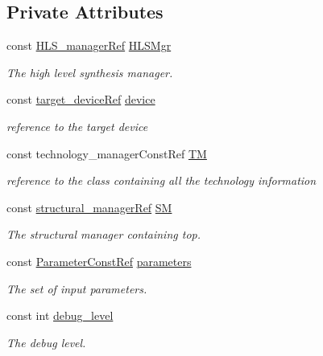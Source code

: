 \subsection*{Private Attributes}
\begin{DoxyCompactItemize}
\item 
const \hyperlink{hls__manager_8hpp_acd3842b8589fe52c08fc0b2fcc813bfe}{H\+L\+S\+\_\+manager\+Ref} \hyperlink{classHDL__manager_a97f281a1319403619497d1d3fec65787}{H\+L\+S\+Mgr}
\begin{DoxyCompactList}\small\item\em The high level synthesis manager. \end{DoxyCompactList}\item 
const \hyperlink{target__device_8hpp_acedb2b7a617e27e6354a8049fee44eda}{target\+\_\+device\+Ref} \hyperlink{classHDL__manager_a39fc9442d1cb94063f582ea205251c4b}{device}
\begin{DoxyCompactList}\small\item\em reference to the target device \end{DoxyCompactList}\item 
const technology\+\_\+manager\+Const\+Ref \hyperlink{classHDL__manager_a36b97521740a378e93cded4e641c4759}{TM}
\begin{DoxyCompactList}\small\item\em reference to the class containing all the technology information \end{DoxyCompactList}\item 
const \hyperlink{structural__manager_8hpp_ab3136f0e785d8535f8d252a7b53db5b5}{structural\+\_\+manager\+Ref} \hyperlink{classHDL__manager_ad3199056804702202557a71f2d78d14e}{SM}
\begin{DoxyCompactList}\small\item\em The structural manager containing top. \end{DoxyCompactList}\item 
const \hyperlink{Parameter_8hpp_a37841774a6fcb479b597fdf8955eb4ea}{Parameter\+Const\+Ref} \hyperlink{classHDL__manager_a45df650b0a63aaf4771fd72ffa22bfa5}{parameters}
\begin{DoxyCompactList}\small\item\em The set of input parameters. \end{DoxyCompactList}\item 
const int \hyperlink{classHDL__manager_aeaabccc887359c7ae08e66f00d2654d6}{debug\+\_\+level}
\begin{DoxyCompactList}\small\item\em The debug level. \end{DoxyCompactList}\end{DoxyCompactItemize}



